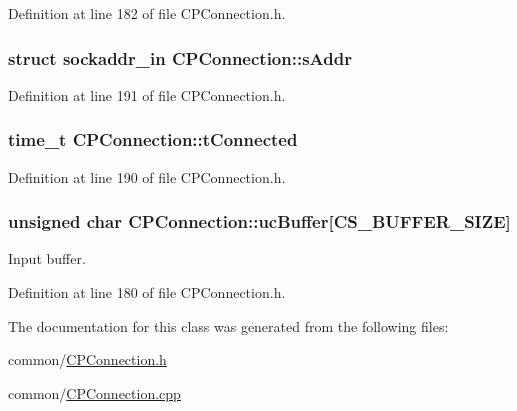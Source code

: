 \-Definition at line 182 of file \-C\-P\-Connection.\-h.

\hypertarget{class_c_p_connection_af5990e2eecbce8a899752e3f195c5cc1}{
\subsubsection[{s\-Addr}]{\setlength{\rightskip}{0pt plus 5cm}struct sockaddr\-\_\-in {\bf \-C\-P\-Connection\-::s\-Addr}}}\label{class_c_p_connection_af5990e2eecbce8a899752e3f195c5cc1}


\-Definition at line 191 of file \-C\-P\-Connection.\-h.

\hypertarget{class_c_p_connection_a758401474fda32b364811b3ccbe2013f}{
\subsubsection[{t\-Connected}]{\setlength{\rightskip}{0pt plus 5cm}time\-\_\-t {\bf \-C\-P\-Connection\-::t\-Connected}}}\label{class_c_p_connection_a758401474fda32b364811b3ccbe2013f}


\-Definition at line 190 of file \-C\-P\-Connection.\-h.

\hypertarget{class_c_p_connection_aa85421d2cbee8274c6794babc609dce6}{
\subsubsection[{uc\-Buffer}]{\setlength{\rightskip}{0pt plus 5cm}unsigned char {\bf \-C\-P\-Connection\-::uc\-Buffer}\mbox{[}{\bf \-C\-S\-\_\-\-B\-U\-F\-F\-E\-R\-\_\-\-S\-I\-Z\-E}\mbox{]}}}\label{class_c_p_connection_aa85421d2cbee8274c6794babc609dce6}


\-Input buffer. 



\-Definition at line 180 of file \-C\-P\-Connection.\-h.



\-The documentation for this class was generated from the following files\-:\begin{DoxyCompactItemize}
\item 
common/\hyperlink{_c_p_connection_8h}{\-C\-P\-Connection.\-h}\item 
common/\hyperlink{_c_p_connection_8cpp}{\-C\-P\-Connection.\-cpp}\end{DoxyCompactItemize}
